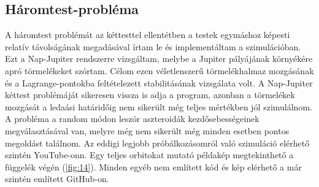 \begin{multicols}{2}
\subsection{Háromtest-probléma} \label{sub:4.4}
A háromtest problémát az kéttesttel ellentétben a testek egymáshoz képesti relatív távolságának megadásával írtam le és implementáltam a szimulációban. Ezt a Nap-Jupiter rendszerre vizsgáltam, melybe a Jupiter pályájának környékére apró törmelékeket szórtam. Célom ezen véletlenszerű törmelékhalmaz mozgásának és a Lagrange-pontokba feltételezett stabilitásának vizsgálata volt. A Nap-Jupiter kéttest problémáját sikeresen vissza is adja a program, azonban a törmelékek mozgását a ledaási határidőig nem sikerült még teljes mértékben jól szimulálnom. A probléma a random módon leszór aszteroidák kezdősebességeinek megválasztásával van, melyre még nem sikerült még minden esetben pontos megoldást találnom. Az eddigi legjobb próbálkozásomról való szimuláció elérhető szintén YouTube-onn\cite{yt}. Egy teljes orbitokat mutató példakép megtekinthető a függelék végén (\ref{fig:14}). Minden egyéb nem említett kód és kép elérhető a már szintén említett GitHub-on\cite{github}.


\end{multicols}
